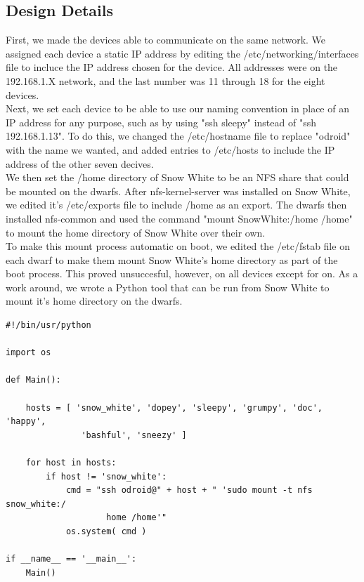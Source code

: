 \subsection{Design Details}
First, we made the devices able to communicate on the same network. We assigned each device a static IP address by editing the /etc/networking/interfaces file to incluce the IP address chosen for the device. All addresses were on the 192.168.1.X network, and the last number was 11 through 18 for the eight devices. \\

Next, we set each device to be able to use our naming convention in place of an IP address for any purpose, such as by using "ssh sleepy" instead of "ssh 192.168.1.13". To do this, we changed the /etc/hostname file to replace "odroid" with the name we wanted, and added entries to /etc/hosts to include the IP address of the other seven decives. \\

We then set the /home directory of Snow White to be an NFS share that could be mounted on the dwarfs. After nfs-kernel-server was installed on Snow White, we edited it's /etc/exports file to include /home as an export. The dwarfs then installed nfs-common and used the command "mount SnowWhite:/home /home" to mount the home directory of Snow White over their own. \\

To make this mount process automatic on boot, we edited the /etc/fstab file on each dwarf to make them mount Snow White's home directory as part of the boot process. This proved unsuccesful, however, on all devices except for on. As a work around, we wrote a Python tool that can be run from Snow White to mount it's home directory on the dwarfs. \pagebreak

\begin{lstlisting}
#!/bin/usr/python

import os

def Main():

	hosts = [ 'snow_white', 'dopey', 'sleepy', 'grumpy', 'doc', 'happy',
			   'bashful', 'sneezy' ]

	for host in hosts:
		if host != 'snow_white':
			cmd = "ssh odroid@" + host + " 'sudo mount -t nfs snow_white:/ 
					home /home'"
			os.system( cmd )

if __name__ == '__main__':
	Main()
\end{lstlisting}

